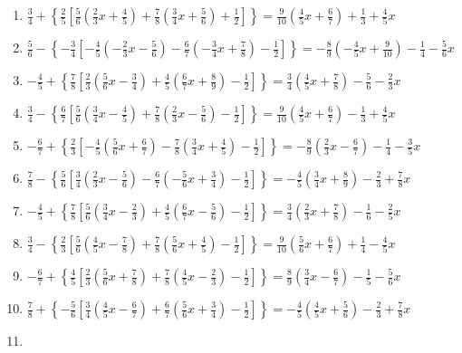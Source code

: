 \documentclass[12pt]{article}
\theoremstyle{plain}
\theoremstyle{definition}
\theoremstyle{remark}
\begin{document}
\begin{enumerate}
  \begin{enumerate}
  \def\labelenumii{\roman{enumii}.}
  \item
    \(\frac{3}{4}+\left\{\frac{2}{5}[\frac{5}{6}(\frac{2}{3}x+\frac{4}{5})+\frac{7}{8}(\frac{3}{4}x+\frac{5}{6})+\frac{1}{2}]\right\}=\frac{9}{10}(\frac{4}{5}x+\frac{6}{7})+\frac{1}{3}+\frac{4}{5}x\)
  \item
    \(\frac{5}{6}-\left\{-\frac{3}{4}[-\frac{4}{5}(-\frac{2}{3}x-\frac{5}{6})-\frac{6}{7}(-\frac{3}{4}x+\frac{7}{8})-\frac{1}{2}]\right\}=-\frac{8}{9}(-\frac{4}{5}x+\frac{9}{10})-\frac{1}{4}-\frac{5}{6}x\)
  \item
    \(-\frac{4}{5}+\left\{\frac{7}{8}[\frac{2}{3}(\frac{5}{6}x-\frac{3}{4})+\frac{4}{5}(\frac{6}{7}x+\frac{8}{9})-\frac{1}{2}]\right\}=\frac{3}{4}(\frac{4}{5}x+\frac{7}{8})-\frac{5}{6}-\frac{2}{3}x\)
  \item
    \(\frac{3}{4}-\left\{\frac{6}{7}[\frac{5}{6}(\frac{3}{4}x-\frac{4}{5})+\frac{7}{8}(\frac{2}{3}x-\frac{5}{6})-\frac{1}{2}]\right\}=\frac{9}{10}(\frac{4}{5}x+\frac{6}{7})-\frac{1}{3}+\frac{4}{5}x\)
  \item
    \(-\frac{6}{7}+\left\{\frac{2}{3}[-\frac{4}{5}(\frac{5}{6}x+\frac{6}{7})-\frac{7}{8}(\frac{3}{4}x+\frac{4}{5})-\frac{1}{2}]\right\}=-\frac{8}{9}(\frac{2}{3}x-\frac{6}{7})-\frac{1}{4}-\frac{3}{5}x\)
  \item
    \(\frac{7}{8}-\left\{\frac{5}{6}[\frac{3}{4}(\frac{2}{3}x-\frac{5}{6})-\frac{6}{7}(-\frac{5}{6}x+\frac{3}{4})-\frac{1}{2}]\right\}=-\frac{4}{5}(\frac{3}{4}x+\frac{8}{9})-\frac{2}{3}+\frac{7}{8}x\)
  \item
    \(-\frac{4}{5}+\left\{\frac{7}{8}[\frac{5}{6}(\frac{3}{4}x-\frac{2}{3})+\frac{4}{5}(\frac{6}{7}x-\frac{5}{6})-\frac{1}{2}]\right\}=\frac{3}{4}(\frac{2}{3}x+\frac{7}{8})-\frac{1}{6}-\frac{2}{5}x\)
  \item
    \(\frac{3}{4}-\left\{\frac{2}{3}[\frac{5}{6}(\frac{4}{5}x-\frac{7}{8})+\frac{7}{8}(\frac{5}{6}x+\frac{4}{5})-\frac{1}{2}]\right\}=\frac{9}{10}(\frac{5}{6}x+\frac{6}{7})+\frac{1}{4}-\frac{4}{5}x\)
  \item
    \(-\frac{6}{7}+\left\{\frac{4}{5}[\frac{2}{3}(\frac{5}{6}x+\frac{7}{8})+\frac{7}{8}(\frac{4}{5}x-\frac{2}{3})-\frac{1}{2}]\right\}=\frac{8}{9}(\frac{3}{4}x-\frac{6}{7})-\frac{1}{5}-\frac{5}{6}x\)
  \item
    \(\frac{7}{8}+\left\{-\frac{5}{6}[\frac{3}{4}(\frac{4}{5}x-\frac{6}{7})+\frac{6}{7}(\frac{5}{6}x+\frac{3}{4})-\frac{1}{2}]\right\}=-\frac{4}{5}(\frac{4}{5}x+\frac{5}{6})-\frac{2}{3}+\frac{7}{8}x\)
  \item

\end{enumerate}
\end{enumerate}
\end{document}
